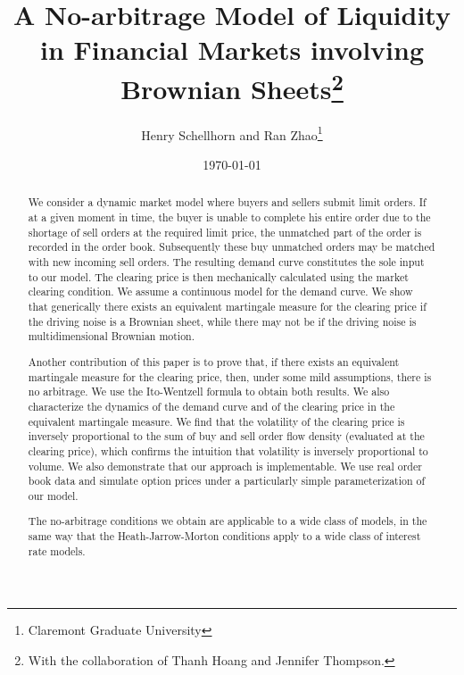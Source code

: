\documentclass{article}
\begin{document}
\title{A No-arbitrage Model of Liquidity in Financial Markets involving
Brownian Sheets\thanks{%
With the collaboration of Thanh Hoang and Jennifer Thompson.}}
\author{Henry Schellhorn and Ran Zhao\thanks{%
Claremont Graduate University}}
\date{\today }
\maketitle

\begin{abstract}
We consider a dynamic market model where buyers and sellers submit limit
orders. If at a given moment in time, the buyer is unable to complete his
entire order due to the shortage of sell orders at the required limit price,
the unmatched part of the order is recorded in the order book. Subsequently
these buy unmatched orders may be matched with new incoming sell orders. The
resulting demand curve constitutes the sole input to our model. The clearing
price is then mechanically calculated using the market clearing condition.
We assume a continuous model for the demand curve. We show that generically
there exists an equivalent martingale measure for the clearing price if the
driving noise is a Brownian sheet, while there may not be if the driving
noise is multidimensional Brownian motion.

Another contribution of this paper is to prove that, if there exists an
equivalent martingale measure for the clearing price, then, under some mild
assumptions, there is no arbitrage. We use the Ito-Wentzell formula to
obtain both results. We also characterize the dynamics of the demand curve
and of the clearing price in the equivalent martingale measure. We find that
the volatility of the clearing price is inversely proportional to the sum of
buy and sell order flow density (evaluated at the clearing price), which
confirms the intuition that volatility is inversely proportional to volume.
We also demonstrate that our approach is implementable. We use real order
book data and simulate option prices under a particularly simple
parameterization of our model.

The no-arbitrage conditions we obtain are applicable to a wide class of
models, in the same way that the Heath-Jarrow-Morton conditions apply to a
wide class of interest rate models.


\end{abstract}
\end{document}

